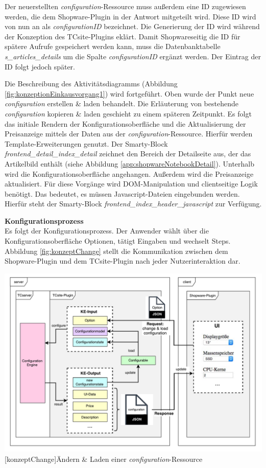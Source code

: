 \documentclass[11pt, a4paper, titlepage, listof=totoc, bibliography=totoc, index=totoc, twoside, openright, headings=normal]{scrreprt}
\begin{document}
Der neuerstellten \emph{configuration}-Ressource muss außerdem eine ID zugewiesen werden, die dem Shopware-Plugin in der Antwort mitgeteilt wird. Diese ID wird von nun an als \emph{configurationID} bezeichnet. Die Generierung der ID wird während der Konzeption des TCsite-Plugins eklärt. Damit Shopwareseitig die ID für spätere Aufrufe gespeichert werden kann, muss die Datenbanktabelle \emph{s\_articles\_details} um die Spalte \emph{configurationID} ergänzt werden. Der Eintrag der ID folgt jedoch später.

Die Beschreibung des Aktivitätsdiagramms (Abbildung \ref{fig:konzeptionEinkausvorgang1}) wird fortgeführt. Oben wurde der Punkt \glqq neue \emph{configuration} erstellen \& laden\grqq{} behandelt. Die Erläuterung von \glqq bestehende \emph{configuration} kopieren \& laden\grqq{} geschieht zu einem späteren Zeitpunkt. Es folgt das initiale Rendern der Konfigurationsoberfläche und die Aktualisierung der Preisanzeige mittels der Daten aus der \emph{configuration}-Ressource. Hierfür werden Template-Erweiterungen genutzt. Der Smarty-Block \emph{frontend\_detail\_index\_detail} zeichnet den Bereich der Detailseite aus, der das Artikelbild enthält (siehe Abbildung \ref{app:shopwareNotebookDetail}). Unterhalb wird die Konfigurationsoberfläche angehangen. Außerdem wird die Preisanzeige aktualisiert. Für diese Vorgänge wird DOM-Manipulation und clientseitige Logik benötigt. Das bedeutet, es müssen Javascript-Dateien eingebunden werden. Hierfür steht der Smarty-Block \emph{frontend\_index\_header\_javascript} zur Verfügung.

\textbf{Konfigurationsprozess}\\
Es folgt der Konfigurationsprozess. Der Anwender wählt über die Konfigurationsoberfläche Optionen, tätigt Eingaben und wechselt Steps. Abbildung \ref{fig:konzeptChange} stellt die Kommunikation zwischen dem Shopware-Plugin und dem TCsite-Plugin nach jeder Nutzerinteraktion dar.

\vspace{1em}
\begin{minipage}{\linewidth}
	\centering
	\includegraphics[width=1\linewidth]{Abbildungen/konzeptChange.pdf}
	[konzeptChange]{Ändern \& Laden einer \emph{configuration}-Ressource}
	\label{fig:konzeptChange}
\end{minipage}
\vspace{1em}
\end{document}
